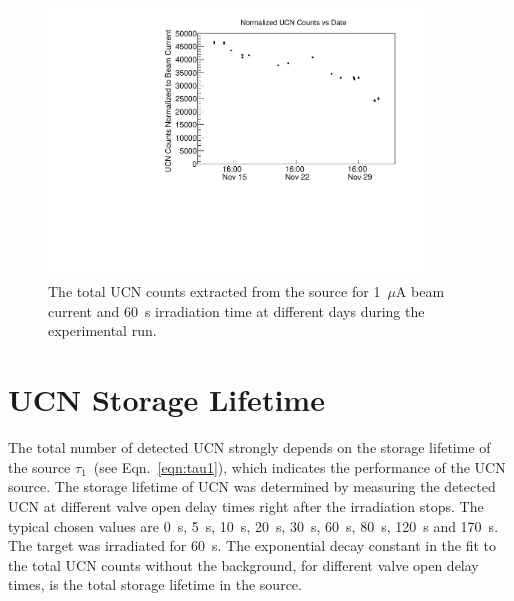 \begin{figure}[h]
  \centering
  \includegraphics[width=0.9\textwidth]{UCNCounts_vs_time.pdf}
  \caption[ UCN yield at 1~$\mu$A beam current and 60~s target
  irradiation over experimental run]{The total UCN counts extracted
    from the source for 1~$\mu$A beam current and 60~s irradiation
    time at different days during the experimental run. }
  \label{fig:UCNCounts_time}
\end{figure}

\section{UCN Storage Lifetime~\label{storagelifetime}}

The total number of detected UCN strongly depends on the storage
lifetime of the source $\tau_1$~(see Eqn.~\ref{eqn:tau1}), which
indicates the performance of the UCN source. The storage lifetime of
UCN was determined by measuring the detected UCN at different valve
open delay times right after the irradiation stops.  The typical
chosen values are 0~s, 5~s, 10~s, 20~s, 30~s, 60~s, 80~s, 120~s and
170~s. The target was irradiated for 60~s.
The exponential decay constant in the fit to the total UCN counts
without the background, for different valve open delay times, is the
total storage lifetime in the source.


